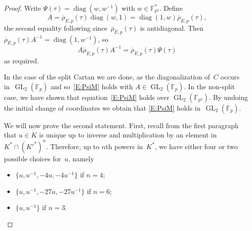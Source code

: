 \documentclass[12pt, reqno]{amsart}
\newcommand{\F}{\mathbb{F}}
\newcommand{\Fp}{\mathbb{F}_p}
\newcommand{\rhobar}{{\overline{\rho}}}
\newcommand{\eps}{\varepsilon}
\newcommand{\GL}{\operatorname{GL}}
\newcommand{\diag}{{\operatorname{diag}}}
\numberwithin{equation}{section}
\theoremstyle{definition}
\theoremstyle{remark}
\newcommand{\jc}[1]{{\color{darkgreen} \textsf{[JC: #1]}}}
\begin{document}
\begin{proof}
\begin{comment}
\jc{New version}
Let~$\tau\in G_K\setminus G_{K'}$ be arbitrary, and
\end{comment}

Write $\Psi(\tau)=\diag(w,w^{-1})$ with $w\in\F_{p^2}^*$.  Define
\[
A=\rhobar_{E,p}(\tau)\diag(w,1)=\diag(1,w)\rhobar_{E,p}(\tau),
\]
the second equality following since~$\rhobar_{E,p}(\tau)$ is
antidiagonal.  Then $\rhobar_{E,p}(\tau)A^{-1}=\diag(1,w^{-1})$, so
\[
A \rhobar_{E,p}(\tau) A^{-1} = \rhobar_{E,p}(\tau)\Psi(\tau)
\]
as required.

In the case of the split Cartan we are done, as the diagonalization
of~$C$ occurs in~$\GL_2(\Fp)$ and so~\eqref{E:PsiM} holds with $A \in
\GL_2(\F_{p})$.  In the non-split case, we have shown that
equation~\eqref{E:PsiM} holds over $\GL_2(\F_{p^2})$. By undoing the
initial change of coordinates we obtain that \eqref{E:PsiM} holds
in~$\GL_2(\Fp)$.

\begin{comment}
  In detail in the non-split case.  Change notation so that for
$\sigma\in G_K$, $\rhobar_{E,p}(\sigma)$ and $\Psi(\sigma)$ denote
matrices with respect to an $\Fp$-basis, and let the change of basis
matrix~$C\in\GL_2(\F_{p^2})$ be such that
\begin{itemize}
\item $C^{-1}\rhobar_{E,p}(\sigma)C = c(\sigma)\diag(1,\eps(\sigma))$
  for $\sigma\in G_{K'}$;
\item $C^{-1}\rhobar_{E,p}(\tau)C$ is anti-diagonal for $\tau\in
  G_K\setminus G_{K'}$;
\item $C^{-1}\Psi(\sigma)C = \diag(\eps(\sigma),\eps(\sigma)^{-1})$
  for $\sigma\in G_{K'}$.
\end{itemize}
Let $B=\rhobar_{E,p}(\tau)\in\GL_2(\Fp)$, so that $A=C^{-1}BC$ is
antidiagonal.  Now the last displayed equation becomes
\[
(C^{-1}BC)(C^{-1}\rhobar_{E,p}(\sigma)C)(C^{-1}B^{-1}C) = (C^{-1}\rhobar_{E,p}(\sigma)C)(C^{-1}\Psi(\sigma)C)
\]
which simplifies to give
\[
B\rhobar_{E,p}(\sigma)B^{-1} = \rhobar_{E,p}(\sigma)\Psi(\sigma)
\]
for all $\sigma\in G_{K'}$, giving~\eqref{E:PsiM} in this case.  When
$\sigma=\tau$, both sides of the preceding equation are equal to
$C^{-1}BC$, so~\eqref{E:PsiM} also holds in that case.
\end{comment}

We will now prove the second statement. First, recall from the first paragraph that $u \in K$ is unique up to inverse and
multiplication by an element
in~$K^*\cap(K'^*)^n$. Therefore, up to $n$th powers in~$K^*$,  
we have either four or two
possible choices for~$u$, namely
\begin{itemize}
  \item $\{u, u^{-1}, -4u, -4u^{-1}\}$ if $n=4$;
  \item $\{u, u^{-1}, -27u, -27u^{-1}\}$ if $n=6$;
  \item $\{u, u^{-1}\}$ if $n=3$.
\end{itemize}


\end{proof}
\end{document}
